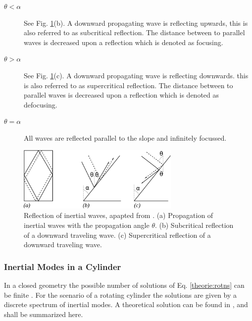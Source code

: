 \begin{description}
    \item[$\theta < \alpha$] See Fig. \ref{theorie:reflection_img}(b). A downward propagating wave is reflecting upwards,
                             this is also referred to as subcritical reflection.
                             The distance between to parallel waves is decreased upon a reflection which is denoted as focusing.
    \item[$\theta > \alpha$] See Fig. \ref{theorie:reflection_img}(c). A downward propagating wave is reflecting downwards.
                             this is also referred to as supercritical reflection.
                             The distance between to parallel waves is decreased upon a reflection which is denoted as defocusing.
    \item[$\theta = \alpha$] All waves are reflected parallel to the slope and infinitely focussed.
\end{description}

\begin{figure}[!bp]
      \centering
        \includegraphics[width=0.7\textwidth]{gfx/theorie/reflection.pdf}
       \caption{Reflection of inertial waves, apapted from \citep{Clausen2011}.
        (a) Propagation of inertial waves with the propagation angle $\theta$.
        (b) Subcritical reflection of a downward traveling wave.
        (c) Supercritical reflection of a downward traveling wave.
       }
       \label{theorie:reflection_img}
\end{figure}

\clearpage


\subsubsection{Inertial Modes in a Cylinder}
\label{theorie:rotating:cyl_modes}

In a closed geometry the possible number of solutions of Eq. \ref{theorie:rotns} can be finite \citep{Clausen2011}.
For the scenario of a rotating cylinder the solutions are given by a discrete spectrum of  inertial modes.
A theoretical solution can be found in \citep{Greenspan1990}, and shall be summarized here.

